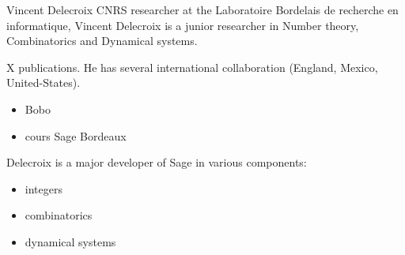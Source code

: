 \begin{participant}[type=leadPI,PM=12,salary=2500,gender=male]{Vincent Delecroix}
  CNRS researcher at the Laboratoire Bordelais de recherche en informatique, Vincent
  Delecroix is a junior researcher in Number theory, Combinatorics and Dynamical systems.

  X publications.  He has several international collaboration (England, Mexico,
  United-States).

  \begin{itemize}
\item  Bobo
\item  cours Sage Bordeaux
\end{itemize}

Delecroix is a major developer of Sage in various components:
\begin{itemize}
\item  integers
\item  combinatorics
\item dynamical systems
\end{itemize}
\end{participant}

